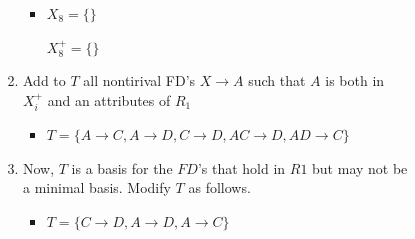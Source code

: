 \documentclass[12pt]{article}
\begin{document}
\begin{enumerate}[1.]
\begin{enumerate}[a)]
\begin{itemize}
\begin{itemize}
\begin{enumerate}[1.]
\begin{itemize}
                        \item $X_8 = \{\}$

                        \bigskip

                        $X_8^+ = \{\}$


                    \end{itemize}
                    \color{black}

                    \item Add to $T$ all nontirival FD's $X \to A$ such that $A$
                    is both in $X_i^+$ and an attributes of $R_1$

                    \color{red}
                    \begin{itemize}
                        \item

                        $T = \{A \to C, A \to D, C \to D, AC \to D, AD \to C\}$
                    \end{itemize}
                    \color{black}

                    \item Now, $T$ is a basis for the $FD$'s that hold in $R1$ but
                    may not be a minimal basis. Modify $T$ as follows.

                    \color{red}
                    \begin{itemize}
                        \item

                        $T = \{C \to D, A \to D , A \to C\}$
                    \end{itemize}
                    \color{black}
                \end{enumerate}
            \end{itemize}
        \end{itemize}
    \end{enumerate}

\end{enumerate}
\end{document}
